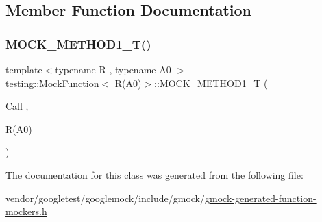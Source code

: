 \subsection{Member Function Documentation}
\mbox{\label{classtesting_1_1_mock_function_3_01_r_07_a0_08_4_a6a22e7e14b53d2df30bef4404b41fade}} 
\subsubsection{\texorpdfstring{M\+O\+C\+K\+\_\+\+M\+E\+T\+H\+O\+D1\+\_\+\+T()}{MOCK\_METHOD1\_T()}}
{\footnotesize\ttfamily template$<$typename R , typename A0 $>$ \\
\hyperlink{classtesting_1_1_mock_function}{testing\+::\+Mock\+Function}$<$ R(A0)$>$\+::M\+O\+C\+K\+\_\+\+M\+E\+T\+H\+O\+D1\+\_\+T (\begin{DoxyParamCaption}\item[{Call}]{,  }\item[{R(A0)}]{ }\end{DoxyParamCaption})}



The documentation for this class was generated from the following file\+:\begin{DoxyCompactItemize}
\item 
vendor/googletest/googlemock/include/gmock/\hyperlink{gmock-generated-function-mockers_8h}{gmock-\/generated-\/function-\/mockers.\+h}\end{DoxyCompactItemize}
